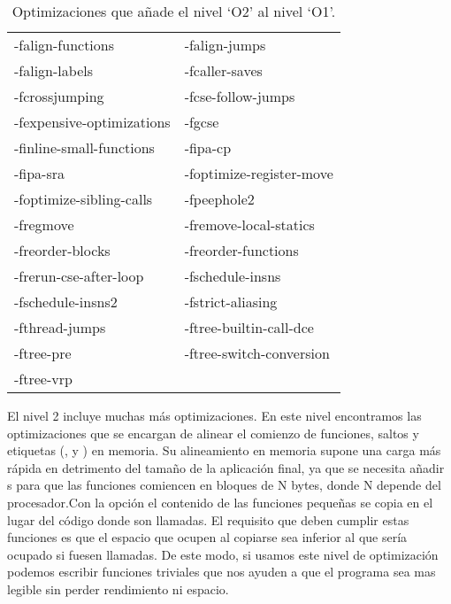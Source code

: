 \begin{table}[H]
\begin{center}
	\begin{tabular}{|ll|}
		\hline
		-falign-functions & -falign-jumps\\
		-falign-labels & -fcaller-saves\\
		-fcrossjumping & -fcse-follow-jumps\\
		-fexpensive-optimizations & -fgcse\\
		-finline-small-functions & -fipa-cp\\
		-fipa-sra & -foptimize-register-move\\
		-foptimize-sibling-calls & -fpeephole2\\
		-fregmove & -fremove-local-statics\\
		-freorder-blocks & -freorder-functions\\
		-frerun-cse-after-loop & -fschedule-insns\\
		-fschedule-insns2 & -fstrict-aliasing\\
		-fthread-jumps & -ftree-builtin-call-dce\\
		-ftree-pre & -ftree-switch-conversion\\
		-ftree-vrp & \\
		\hline
	\end{tabular}
\end{center}
\caption{Optimizaciones que añade el nivel `O2' al nivel `O1'.}
\label{optimizaciones2}
\end{table}

El nivel 2 incluye muchas más optimizaciones. En este nivel encontramos las optimizaciones  que se encargan de alinear el comienzo de funciones, saltos y etiquetas (,  y ) en memoria. Su alineamiento en memoria supone una carga más rápida en detrimento del tamaño de la aplicación final, ya que se necesita añadir s para que las funciones comiencen en bloques de N bytes, donde N depende del procesador.Con la opción  el contenido de las funciones pequeñas se copia en el lugar del código donde son llamadas. El requisito que deben cumplir estas funciones es que el espacio que ocupen al copiarse sea inferior al que sería ocupado si fuesen llamadas. De este modo, si usamos este nivel de optimización podemos escribir funciones triviales que nos ayuden a que el programa sea mas legible sin perder rendimiento ni espacio.


